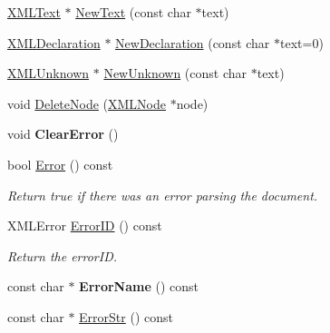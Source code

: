 \begin{DoxyCompactItemize}
\mbox{\hyperlink{classtinyxml2_1_1_x_m_l_text}{X\+M\+L\+Text}} $\ast$ \mbox{\hyperlink{classtinyxml2_1_1_x_m_l_document_acece5de77a0819f2341b08c1e1ed9987}{New\+Text}} (const char $\ast$text)
\item 
\mbox{\hyperlink{classtinyxml2_1_1_x_m_l_declaration}{X\+M\+L\+Declaration}} $\ast$ \mbox{\hyperlink{classtinyxml2_1_1_x_m_l_document_ae519030c0262fa2daff8993681990e16}{New\+Declaration}} (const char $\ast$text=0)
\item 
\mbox{\hyperlink{classtinyxml2_1_1_x_m_l_unknown}{X\+M\+L\+Unknown}} $\ast$ \mbox{\hyperlink{classtinyxml2_1_1_x_m_l_document_a4954f502c5fd7f49de54c3c0c99bb73d}{New\+Unknown}} (const char $\ast$text)
\item 
void \mbox{\hyperlink{classtinyxml2_1_1_x_m_l_document_ac1d6e2c7fcc1a660624ac4f68e96380d}{Delete\+Node}} (\mbox{\hyperlink{classtinyxml2_1_1_x_m_l_node}{X\+M\+L\+Node}} $\ast$node)
\item 
\mbox{\label{classtinyxml2_1_1_x_m_l_document_a4085d9c52f1d93214311459d6d1fcf17}} 
void {\bfseries Clear\+Error} ()
\item 
\mbox{\label{classtinyxml2_1_1_x_m_l_document_a34e6318e182e40e3cc4f4ba5d59ed9ed}} 
bool \mbox{\hyperlink{classtinyxml2_1_1_x_m_l_document_a34e6318e182e40e3cc4f4ba5d59ed9ed}{Error}} () const
\begin{DoxyCompactList}\small\item\em Return true if there was an error parsing the document. \end{DoxyCompactList}\item 
\mbox{\label{classtinyxml2_1_1_x_m_l_document_afa3ed33b3107f920ec2b301f805ac17d}} 
X\+M\+L\+Error \mbox{\hyperlink{classtinyxml2_1_1_x_m_l_document_afa3ed33b3107f920ec2b301f805ac17d}{Error\+ID}} () const
\begin{DoxyCompactList}\small\item\em Return the error\+ID. \end{DoxyCompactList}\item 
\mbox{\label{classtinyxml2_1_1_x_m_l_document_a1a5f2b63427caffd4cde15781d9d11f9}} 
const char $\ast$ {\bfseries Error\+Name} () const
\item 
const char $\ast$ \mbox{\hyperlink{classtinyxml2_1_1_x_m_l_document_ae97fff2402a0d01e0509c430b37996b3}{Error\+Str}} () const

\end{DoxyCompactItemize}
